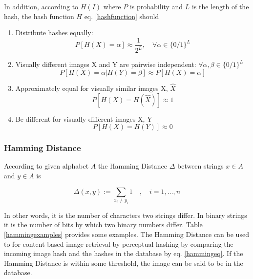 \documentclass[english,12pt,a4paper,pdftex,elec,utf8, table]{aaltothesis}
\begin{document}
In addition, according to \cite{mihccak2001new} $H(I)$ where $P$ is probability and $L$ is the length of the hash, the hash function $H$ eq. \ref{hashfunction} should
\begin{enumerate}
\item Distribute hashes equally:\\
  \begin{equation}\label{phashdistribute}
  P[H(X)=\alpha]\approx\frac{1}{2^L},\quad\forall\alpha\in \{0/1\}^L
  \end{equation}
\item Visually different images X and Y are pairwise independent: $\forall\alpha,\beta\in\{0/1\}^L$\\
  \begin{equation}\label{phashindependent}
    P[H(X)=\alpha|H(Y)=\beta]\approx P[H(X)=\alpha]
  \end{equation}
\item Approximately equal for visually similar images X, $\hat{X}$\\
  \begin{equation}\label{phashsame}
    P[H(X) = H(\hat{X})] \approx 1
  \end{equation}

\item Be different for visually different images X, Y\\
  \begin{equation}\label{phashdif}
    P[H(X)=H(Y)]\approx 0
  \end{equation}
\end{enumerate}

\subsubsection{Hamming Distance}\label{HammingSection}
According to \cite{Hamming1950} given alphabet $A$ the Hamming Distance $\Delta$ between strings $x \in A$ and $y \in A$ is

\begin{equation}\label{hammingeq}
\Delta(x,y):=\sum_{x_i\neq y_i}1\quad,\quad i=1,\ldots,n
\end{equation}

In other words, it is the number of characters two strings differ. In binary strings it is the number of bits by which two binary numbers differ. Table \ref{hammingexamples} provides some examples. The Hamming Distance can be used to for content based image retrieval by perceptual hashing by comparing the incoming image hash and the hashes in the database by eq. \ref{hammingeq}. If the Hamming Distance is within some threshold, the image can be said to be in the database.
\end{document}
